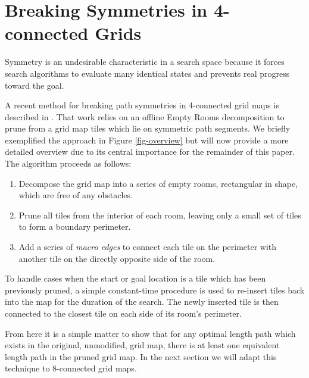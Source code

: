 \section{Breaking Symmetries in 4-connected Grids}
Symmetry is an undesirable characteristic in a search space because it forces
search algorithms to evaluate many identical states and prevents real progress toward the goal.
\par
A recent method for breaking path symmetries in 4-connected grid maps is described in \cite{harabor10}.
That work relies on an offline Empty Rooms decomposition to prune from a grid map tiles which lie on 
symmetric path segments.
We briefly exemplified the approach in Figure \ref{fig-overview} but will now provide a more detailed overview
due to its central importance for the remainder of this paper.
The algorithm proceeds as follows:
\begin{enumerate}
\item{Decompose the grid map into a series of empty rooms, rectangular in shape, which are free of any obstacles.}
\item{Prune all tiles from the interior of each room, leaving only a small set of tiles to form a boundary perimeter.} 
\item{Add a series of \emph{macro edges} to connect each tile on the perimeter with another tile on the directly opposite side
of the room. }
\end{enumerate}
To handle cases when the start or goal location is a tile which has been previously pruned, a simple constant-time
procedure is used to re-insert tiles back into the map for the duration of the search.
The newly inserted tile is then connected to the closest tile on each side of its room's perimeter.

From here it is a simple matter to show that for any optimal length path which exists in the original, unmodified, grid
map, there is at least one equivalent length path in the pruned grid map. 
In the next section we will adapt this technique to 8-connected grid maps. 
